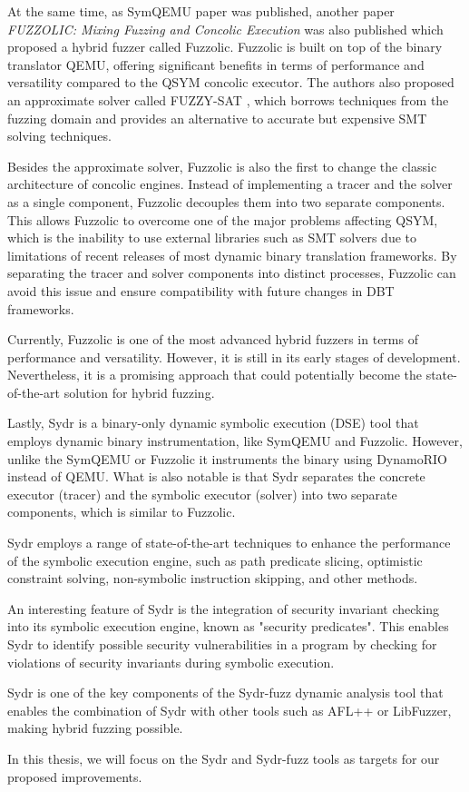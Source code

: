 
At the same time, as SymQEMU paper was published, another paper \textit{FUZZOLIC: Mixing Fuzzing and Concolic Execution} \cite{fuzzolic-hybrid-fuzzer} was also published which proposed a hybrid fuzzer called Fuzzolic. Fuzzolic is built on top of the binary translator QEMU, offering significant benefits in terms of performance and versatility compared to the QSYM concolic executor. The authors also proposed an approximate solver called FUZZY-SAT \cite{fuzzy-sat-fuzzing-symbolic-expressions}, which borrows techniques from the fuzzing domain and provides an alternative to accurate but expensive SMT solving techniques.

Besides the approximate solver, Fuzzolic is also the first to change the classic architecture of concolic engines. Instead of implementing a tracer and the solver as a single component, Fuzzolic decouples them into two separate components. This allows Fuzzolic to overcome one of the major problems affecting QSYM, which is the inability to use external libraries such as SMT solvers due to limitations of recent releases of most dynamic binary translation frameworks. By separating the tracer and solver components into distinct processes, Fuzzolic can avoid this issue and ensure compatibility with future changes in DBT frameworks.

Currently, Fuzzolic is one of the most advanced hybrid fuzzers in terms of performance and versatility. However, it is still in its early stages of development. Nevertheless, it is a promising approach that could potentially become the state-of-the-art solution for hybrid fuzzing.

 \label{hybrid-fuzzing:sydr}

Lastly, Sydr \cite{sydr-cutting-edge-dynamic-symbolic-execution} is a binary-only dynamic symbolic execution (DSE) tool that employs dynamic binary instrumentation, like SymQEMU and Fuzzolic. However, unlike the SymQEMU or Fuzzolic it instruments the binary using DynamoRIO instead of QEMU. What is also notable is that Sydr separates the concrete executor (tracer) and the symbolic executor (solver) into two separate components, which is similar to Fuzzolic.

Sydr employs a range of state-of-the-art techniques to enhance the performance of the symbolic execution engine, such as path predicate slicing, optimistic constraint solving, non-symbolic instruction skipping, and other methods.

An interesting feature of Sydr is the integration of security invariant checking into its symbolic execution engine, known as "security predicates". This enables Sydr to identify possible security vulnerabilities in a program by checking for violations of security invariants during symbolic execution.

Sydr is one of the key components of the Sydr-fuzz \cite{sydr-fuzz-ispras-2022} dynamic analysis tool that enables the combination of Sydr with other tools such as AFL++ or LibFuzzer, making hybrid fuzzing possible.

In this thesis, we will focus on the Sydr and Sydr-fuzz tools as targets for our proposed improvements.
